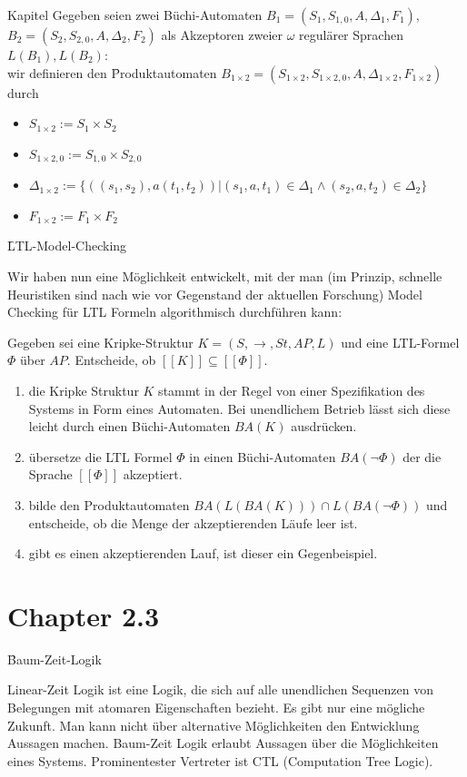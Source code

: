 \begin{chapter}{Kapitel}
\noindent Gegeben seien zwei Büchi-Automaten $B_1=(S_1,S_{1,0},A,\Delta_1,F_1)$, $B_2=(S_2,S_{2,0},A,\Delta_2,F_2)$ als Akzeptoren zweier $\omega$ regulärer
Sprachen $L(B_1),L(B_2)$:  \\ wir definieren den \f{Produktautomaten} $B_{1\times2} =(S_{1\times2},S_{1\times2,0},A,\Delta_{1\times2},F_{1\times2})$ durch 
\begin{itemize}
 \item $S_{1\times2} := S_1\times S_2$
 \item $S_{1\times2,0} := S_{1,0}\times S_{2,0}$
 \item $\Delta_{1\times2} := \{((s_1,s_2),a(t_1,t_2))|(s_1,a,t_1)\in \Delta_1 \wedge (s_2,a,t_2)\in \Delta_2\}$
 \item $F_{1\times2} := F_1\times F_2$
\end{itemize}
\vspace*{6pt}
\f{LTL-Model-Checking}
\vspace*{5pt}

\noindent Wir haben nun eine Möglichkeit entwickelt, mit der man (im Prinzip, schnelle Heuristiken sind nach wie vor Gegenstand der aktuellen Forschung) Model 
Checking für LTL Formeln algorithmisch durchführen kann:

\noindent Gegeben sei eine Kripke-Struktur $K=(S,\rightarrow, St,AP,L)$ und eine LTL-Formel $\Phi$ über $AP$. Entscheide, ob $[[K]] \subseteq [[\Phi]]$.
\begin{enumerate}
 \item die Kripke Struktur $K$ stammt in der Regel von einer Spezifikation des Systems in Form eines Automaten. Bei unendlichem Betrieb lässt sich diese leicht 
 durch einen Büchi-Automaten $BA(K)$ ausdrücken. 
 \item übersetze die LTL Formel $\Phi$ in einen Büchi-Automaten $BA(\neg\Phi)$ der die Sprache $[[\Phi]]$ akzeptiert.
 \item bilde den Produktautomaten $BA(L(BA(K)))\cap L(BA(\neg\Phi))$ und entscheide, ob  die Menge der akzeptierenden Läufe leer ist. 
 \item gibt es einen akzeptierenden Lauf, ist dieser ein Gegenbeispiel.
\end{enumerate}

\section*{Chapter 2.3}
\f{Baum-Zeit-Logik}

\noindent Linear-Zeit Logik ist eine Logik, die sich auf alle unendlichen Sequenzen von Belegungen mit atomaren Eigenschaften bezieht. Es gibt nur eine 
mögliche Zukunft. Man kann nicht über alternative Möglichkeiten den Entwicklung Aussagen machen. Baum-Zeit Logik erlaubt Aussagen über die Möglichkeiten eines
Systems. Prominentester Vertreter ist CTL (Computation Tree Logic).
\vspace*{5pt}


\end{chapter}
